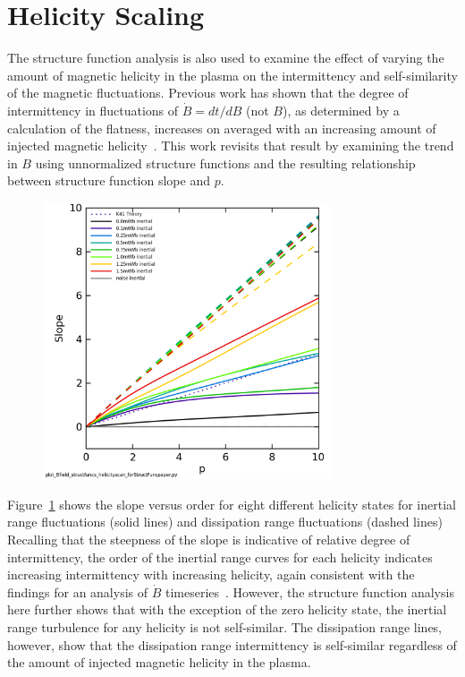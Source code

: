 \documentclass[aps,prl,amsmath,amssymb,reprint,superscriptaddress]{revtex4-1} %
\begin{document}
\section{Helicity Scaling}

The structure function analysis is also used to examine the effect of varying the amount of magnetic helicity in the plasma on the intermittency and self-similarity of the magnetic fluctuations. Previous work has shown that the degree of intermittency in fluctuations of $\dot{B}=dt/dB$ (not $B$), as determined by a calculation of the flatness, increases on averaged with an increasing amount of injected magnetic helicity~\cite{schaffner2014b}. This work revisits that result by examining the trend in $B$ using unnormalized structure functions and the resulting relationship between structure function slope and $p$. 

\begin{figure}[!htbp]
\centerline{
\includegraphics[width=8.5cm]{Bmod_StructureFunctionSlope_vs_Moment_helicityscan.png}}
\caption{\label{fig:helscan} }
\end{figure}

Figure~\ref{fig:helscan} shows the slope versus order for eight different helicity states for inertial range fluctuations (solid lines) and dissipation range fluctuations (dashed lines) Recalling that the steepness of the slope is indicative of relative degree of intermittency, the order of the inertial range curves for each helicity indicates increasing intermittency with increasing helicity, again consistent with the findings for an analysis of $\dot{B}$ timeseries~\cite{schaffner2014b}. However, the structure function analysis here further shows that with the exception of the zero helicity state, the inertial range turbulence for any helicity is not self-similar. The dissipation range lines, however, show that the dissipation range intermittency is self-similar regardless of the amount of injected magnetic helicity in the plasma.
\end{document}
